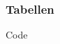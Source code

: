 \begin{frame}
    \frametitle{Tabellen}
    \begin{block}{Code}
        \begin{columns}
            \begin{column}{0.60\textwidth}
                
            \end{column}
            \pause
            \begin{column}{0.4\textwidth}
                \centering
                
            \end{column}
        \end{columns}
    \end{block}
\end{frame}
